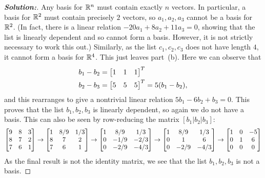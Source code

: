 \documentclass[a4paper]{amsart}
\theoremstyle{definition}
\newenvironment{solution}{\begin{proof}[\textbf{Solution:}] \vphantom{u}}{\end{proof}}
\begin{document}
\begin{solution}
 Any basis for ${\mathbb{R}}^n$ must contain exactly $n$ vectors.  In
 particular, a basis for ${\mathbb{R}}^2$ must contain precisely $2$ vectors, so
 $a_1,a_2,a_3$ cannot be a basis for ${\mathbb{R}}^2$.  (In fact, there is a
 linear relation $-20a_1+8a_2+11a_3=0$, showing that the list is
 linearly dependent and so cannot form a basis.  However, it is not
 strictly necessary to work this out.)  Similarly, as the list
 $c_1,c_2,c_3$ does not have length $4$, it cannot form a basis for
 ${\mathbb{R}}^4$.  This just leaves part~(b).  Here we can observe that
 \begin{align*} 
  b_1-b_2 &= \left[\begin{matrix} 1&1&1\end{matrix}\right]^T \\
  b_2-b_3 &= \left[\begin{matrix} 5&5&5\end{matrix}\right]^T = 5(b_1-b_2),
 \end{align*}
 and this rearranges to give a nontrivial linear relation
 $5b_1-6b_2+b_3=0$.  This proves that the list $b_1,b_2,b_3$ is
 linearly dependent, so again we do not have a basis.  This can also
 be seen by row-reducing the matrix $[b_1|b_2|b_3]$:
 \[ 
  \left[\begin{matrix} 9 & 8 & 3 \\
       8 & 7 & 2 \\
       7 & 6 & 1 \end{matrix}\right] \to
  \left[\begin{matrix} 1 & 8/9 & 1/3 \\
       8 &   7 &   2 \\ 
       7 &   6 &   1 \end{matrix}\right] \to
  \left[\begin{matrix} 1 &  8/9 &  1/3 \\
       0 & -1/9 & -2/3 \\ 
       0 & -2/9 & -4/3 \end{matrix}\right] \to
  \left[\begin{matrix} 1 &  8/9 &  1/3 \\
       0 &    1 &    6 \\ 
       0 & -2/9 & -4/3 \end{matrix}\right] \to
  \left[\begin{matrix} 1 &    0 &  -5 \\
       0 &    1 &   6 \\ 
       0 &    0 &   0 \end{matrix}\right]
 \]
 As the final result is not the identity matrix, we see that the list
 $b_1,b_2,b_3$ is not a basis.
\end{solution}
\end{document}
